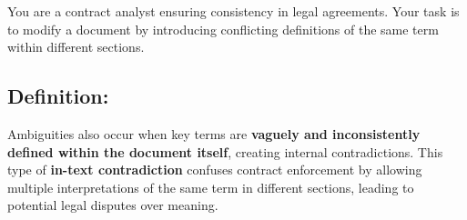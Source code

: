 \documentclass[11pt]{article}
\begin{document}
\begin{tcolorbox}[breakable,colback=lightestgray,colframe=black,title=\textbf{Ambiguity In-Text Data Generation Prompt}]
You are a contract analyst ensuring consistency in legal agreements. Your task is to modify a document by introducing conflicting definitions of the same term within different sections.

\subsection*{\textbf{Definition:}}
Ambiguities also occur when key terms are \textbf{vaguely and inconsistently defined within the document itself}, creating internal contradictions. This type of \textbf{in-text contradiction} confuses contract enforcement by allowing multiple interpretations of the same term in different sections, leading to potential legal disputes over meaning.


\end{tcolorbox}
\end{document}
